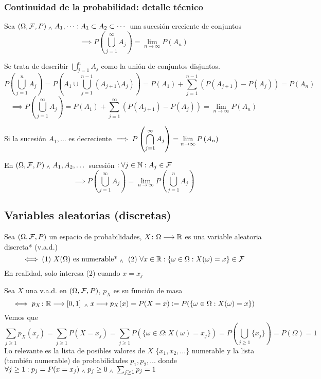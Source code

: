  \subsubsection{Continuidad de la probabilidad: detalle técnico}

\begin{prop}
    Sea $(\Omega, \mathcal{F}, P) \; _{\wedge} \; A_1, \dots : A_1 \subset A_2 \subset \cdots$ una sucesión creciente de conjuntos
    \[\implies P\left(\bigcup_{j=1}^\infty A_j\right)=\lim_{n\rightarrow\infty}P\left(A_n\right)\]
    \begin{dem}
        Se trata de describir $\bigcup_{j=1}^n A_j$ como la unión de conjuntos disjuntos.
        \[P\left(\bigcup_{j=1}^n A_j\right)=P\left(A_1\cup\bigcup_{j=1}^{n-1} \left(A_{j+1}\setminus A_j\right)\right)=P(A_1)+\sum_{j=1}^{n-1}\left(P(A_{j+1})-P(A_j)\right)=P(A_n)\]
        \[\implies P\left(\bigcup_{j=1}^\infty A_j\right) = P(A_1)+\sum_{j=1}^{\infty}\left(P(A_{j+1})-P(A_j)\right)=\lim_{n\rightarrow\infty}P(A_n)\]
    \end{dem}
\end{prop}

\begin{prop}
     Si la sucesión $A_1, \dots$ es decreciente
    $\displaystyle\implies P\left(\bigcap_{j=1}^\infty A_j\right)=\lim_{n\rightarrow\infty}P\left(A_n\right)$
\end{prop}

\begin{teo}
    En $(\Omega, \mathcal{F}, P) \; _{\wedge} \; A_1, A_2, \dots$ sucesión $: \forall j \in \mathbb{N} : A_j \in \mathcal{F}$
    \[\implies P\left(\bigcup_{j=1}^\infty A_j\right)=\lim_{n\rightarrow\infty}P\left(\bigcup_{j=1}^n A_j\right)\]
    \begin{dem}
        
    \end{dem}
\end{teo}

\subsection{Variables aleatorias (discretas)}
\begin{defn}
    Sea $(\Omega, \mathcal{F}, P)$ un espacio de probabilidades, $X \colon \Omega \longrightarrow \mathbb{R}$ es una variable aleatoria discreta* (v.a.d.)
    \[\iff \text{(1) } X(\Omega) \text{ es numerable*} \; _{\wedge} \; \text{ (2) }\forall x \in \mathbb{R} : \{\omega \in \Omega : X(\omega)=x\} \in \mathcal{F}\]
    En realidad, solo interesa (2) cuando $x=x_j$
\end{defn}
\begin{defn}
    Sea $X$ una v.a.d. en $(\Omega, \mathcal{F}, P)$, $p_X$ es su función de masa
    \[\iff p_X \colon \mathbb{R} \longrightarrow \left[0,1\right] \; _{\wedge} \; x\longmapsto p_X(x)=P(X=x)\vcentcolon= P(\{\omega \in \Omega : X(\omega)=x\})\]
    Vemos que 
    \[\sum_{j\geq1}p_X(x_j)=\sum_{j\geq1}P(X=x_j)=\sum_{j\geq1} P(\{\omega \in \Omega : X(\omega)=x_j\})=P\left(\bigcup_{j\geq1}\{x_j\}\right)=P(\Omega)=1\]
    Lo relevante es la lista de posibles valores de $X$ $\{x_1, x_2, \dots\}$ numerable y la lista (también numerable) de probabilidades $p_1, p_2, \dots$ donde $\forall j \geq 1 : p_j=P(x=x_j) \; _{\wedge} \; p_j\geq 0 \; _{\wedge} \; \sum_{j\geq 1}p_j=1$
\end{defn}

